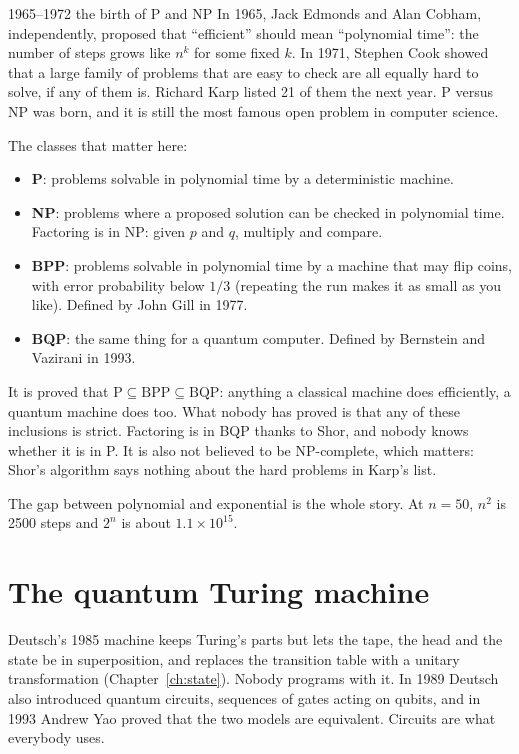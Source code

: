 \begin{history}{1965--1972 \textperiodcentered{} the birth of P and NP}
In 1965, Jack Edmonds and Alan Cobham, independently, proposed that ``efficient''
should mean ``polynomial time'': the number of steps grows like $n^k$ for some
fixed $k$. In 1971, Stephen Cook showed that a large family of problems that are
easy to check are all equally hard to solve, if any of them is. Richard Karp
listed 21 of them the next year. P versus NP was born, and it is still the most
famous open problem in computer science.
\end{history}

The classes that matter here:

\begin{itemize}
\item \textbf{P}: problems solvable in polynomial time by a deterministic machine.
\item \textbf{NP}: problems where a proposed solution can be checked in polynomial
time. Factoring is in NP: given $p$ and $q$, multiply and compare.
\item \textbf{BPP}: problems solvable in polynomial time by a machine that may flip
coins, with error probability below $1/3$ (repeating the run makes it as small as
you like). Defined by John Gill in 1977.
\item \textbf{BQP}: the same thing for a quantum computer. Defined by Bernstein and
Vazirani in 1993.
\end{itemize}

It is proved that $\mathrm{P} \subseteq \mathrm{BPP} \subseteq \mathrm{BQP}$:
anything a classical machine does efficiently, a quantum machine does too. What
nobody has proved is that any of these inclusions is strict. Factoring is in BQP
thanks to Shor, and nobody knows whether it is in P. It is also not believed to
be NP-complete, which matters: Shor's algorithm says nothing about the hard
problems in Karp's list.

The gap between polynomial and exponential is the whole story. At $n = 50$, $n^2$
is 2500 steps and $2^n$ is about $1.1 \times 10^{15}$.

\section{The quantum Turing machine}

Deutsch's 1985 machine keeps Turing's parts but lets the tape, the head and the
state be in superposition, and replaces the transition table with a unitary
transformation (Chapter~\ref{ch:state}). Nobody programs with it. In 1989
Deutsch also introduced quantum circuits, sequences of gates acting on qubits,
and in 1993 Andrew Yao proved that the two models are equivalent. Circuits are
what everybody uses.

